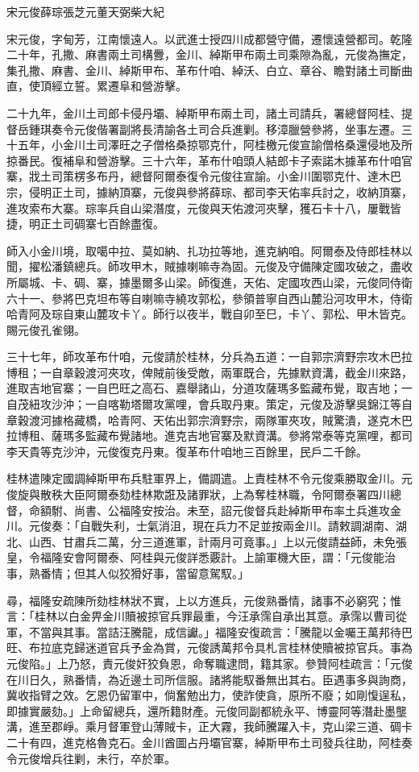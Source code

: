 
\begin{pinyinscope}
宋元俊薛琮張芝元董天弼柴大紀

宋元俊，字甸芳，江南懷遠人。以武進士授四川成都營守備，遷懷遠營都司。乾隆二十年，孔撒、麻書兩土司構釁，金川、綽斯甲布兩土司乘隙為亂，元俊為撫定，集孔撒、麻書、金川、綽斯甲布、革布什咱、綽沃、白立、章谷、瞻對諸土司斷曲直，使頂經立誓。累遷阜和營游擊。

二十九年，金川土司郎卡侵丹壩、綽斯甲布兩土司，諸土司請兵，署總督阿桂、提督岳鍾琪奏令元俊偕署副將長清諭各土司合兵進剿。移漳臘營參將，坐事左遷。三十五年，小金川土司澤旺之子僧格桑掠鄂克什，阿桂檄元俊宣諭僧格桑還侵地及所掠番民。復補阜和營游擊。三十六年，革布什咱頭人結郎卡子索諾木據革布什咱官寨，戕土司策楞多布丹，總督阿爾泰復令元俊往宣諭。小金川圍鄂克什、達木巴宗，侵明正土司，據納頂寨，元俊與參將薛琮、都司李天佑率兵討之，收納頂寨，進攻索布大寨。琮率兵自山梁潛度，元俊與天佑渡河夾擊，獲石卡十八，屢戰皆捷，明正土司碉寨七百餘盡復。

師入小金川境，取噶中拉、莫如納、扎功拉等地，進克納咱。阿爾泰及侍郎桂林以聞，擢松潘鎮總兵。師攻甲木，賊據喇嘛寺為固。元俊及守備陳定國攻破之，盡收所屬城、卡、碉、寨，據墨爾多山梁。師復進，天佑、定國攻西山梁，元俊同侍衛六十一、參將巴克坦布等自喇嘛寺繞攻郭松，參領普寧自西山麓沿河攻甲木，侍衛哈青阿及琮自東山麓攻卡丫。師行以夜半，戰自卯至巳，卡丫、郭松、甲木皆克。賜元俊孔雀翎。

三十七年，師攻革布什咱，元俊請於桂林，分兵為五道：一自郭宗濟野宗攻木巴拉博租；一自章穀渡河夾攻，俾賊前後受敵，兩軍既合，先據默資溝，截金川來路，進取吉地官寨；一自巴旺之高石、嘉舉諸山，分道攻薩瑪多監藏布覺，取吉地；一自茂紐攻沙沖；一自喀勒塔爾攻黨哩，會兵取丹東。策定，元俊及游擊吳錦江等自章穀渡河據格藏橋，哈青阿、天佑出郭宗濟野宗，兩隊軍夾攻，賊驚潰，遂克木巴拉博租、薩瑪多監藏布覺諸地。進克吉地官寨及默資溝。參將常泰等克黨哩，都司李天貴等克沙沖，元俊復克丹東。復革布什咱地三百餘里，民戶二千餘。

桂林遣陳定國調綽斯甲布兵駐軍界上，備調遣。上責桂林不令元俊乘勝取金川。元俊旋與散秩大臣阿爾泰劾桂林欺誑及諸罪狀，上為奪桂林職，令阿爾泰署四川總督，命額駙、尚書、公福隆安按治。未至，詔元俊督兵赴綽斯甲布率土兵進攻金川。元俊奏：「自戰失利，士氣消沮，現在兵力不足並按兩金川。請敕調湖南、湖北、山西、甘肅兵二萬，分三道進軍，計兩月可竟事。」上以元俊請益師，未免張皇，令福隆安會阿爾泰、阿桂與元俊詳悉覈計。上諭軍機大臣，謂：「元俊能治事，熟番情；但其人似狡猾好事，當留意駕馭。」

尋，福隆安疏陳所劾桂林狀不實，上以方進兵，元俊熟番情，諸事不必窮究；惟言：「桂林以白金畀金川贖被掠官兵罪最重，今汪承霈自承出其意。承霈以曹司從軍，不當與其事。當詰汪騰龍，成信讞。」福隆安復疏言：「騰龍以金囑王萬邦待巴旺、布拉底克歸迷道官兵予金為賞，元俊誘萬邦令具札言桂林使贖被掠官兵。事為元俊陷。」上乃怒，責元俊奸狡負恩，命奪職逮問，籍其家。參贊阿桂疏言：「元俊在川日久，熟番情，為近邊土司所信服。諸將能馭番無出其右。臣遇事多與詢商，冀收指臂之效。乞恩仍留軍中，倘奮勉出力，使詐使貪，原所不廢；如剛愎逞私，即據實嚴劾。」上命留總兵，還所籍財產。元俊同副都統永平、博靈阿等潛赴墨壟溝，進至郡崢。乘月督軍登山薄賊卡，正大霧，我師騰躍入卡，克山梁三道、碉卡二十有四，進克格魯克石。金川酋圖占丹壩官寨，綽斯甲布土司發兵往助，阿桂奏令元俊增兵往剿，未行，卒於軍。


\end{pinyinscope}
